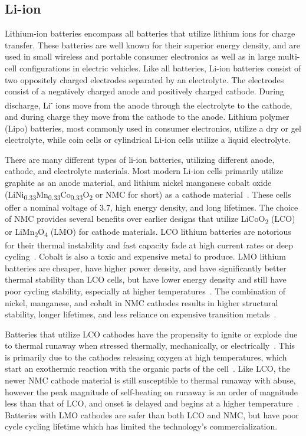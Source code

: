 \subsection{Li-ion}
Lithium-ion batteries encompass all batteries that utilize lithium ions for charge transfer. These batteries are well known for their superior energy density, and are used in small wireless and portable consumer electronics as well as in large multi-cell configurations in electric vehicles.
Like all batteries, Li-ion batteries consist of two oppositely charged electrodes separated by an electrolyte. The electrodes consist of a negatively charged anode and positively charged cathode. During discharge, Li\textsuperscript{-} ions move from the anode through the electrolyte to the cathode, and during charge they move from the cathode to the anode.
Lithium polymer (Lipo) batteries, most commonly used in consumer electronics, utilize a dry or gel electrolyte, while coin cells or cylindrical Li-ion cells utilize a liquid electrolyte. 

There are many different types of li-ion batteries, utilizing different anode, cathode, and electrolyte materials. Most modern Li-ion cells primarily utilize graphite as an anode material, and lithium nickel manganese cobalt oxide
(LiNi\textsubscript{0.33}Mn\textsubscript{0.33}Co\textsubscript{0.33}O\textsubscript{2} or NMC for short) as a cathode material~\cite{nitta2015li}.
These cells offer a nominal voltage of 3.7\ssi{\volt}, high energy density, and long lifetimes. 
The choice of NMC provides several benefits over earlier designs that utilize 
LiCoO\textsubscript{2} (LCO) or LiMn\textsubscript{2}O\textsubscript{4} (LMO) for cathode materials.
LCO lithium batteries are notorious for their thermal instability and fast capacity fade at high current rates or deep cycling~\cite{nitta2015li}. 
Cobalt is also a toxic and expensive metal to produce. 
LMO lithium batteries are cheaper, have higher power density, and have significantly better thermal stability than LCO cells, but have lower energy density and still have poor cycling stability, especially at higher temperatures~\cite{nitta2015li}.
The combination of nickel, manganese, and cobalt in NMC cathodes results in higher structural stability, longer lifetimes, and less reliance on expensive transition metals~\cite{nitta2015li}. 

Batteries that utilize LCO cathodes have the propensity to ignite or explode due to thermal runaway when stressed thermally, mechanically, or electrically~\cite{doughty2012general}. This is primarily due to the cathodes releasing oxygen at high temperatures, which start an exothermic reaction with the organic parts of the cell~\cite{doughty2012general, nitta2015li}. Like LCO, the newer NMC cathode material is still susceptible to thermal runaway with abuse, however the peak magnitude of self-heating on runaway is an order of magnitude less than that of LCO, and onset is delayed and begins at a higher temperature~\cite{doughty2012general}.
Batteries with LMO cathodes are safer than both LCO and NMC, but have poor cycle cycling lifetime which has limited the technology's commercialization. 

